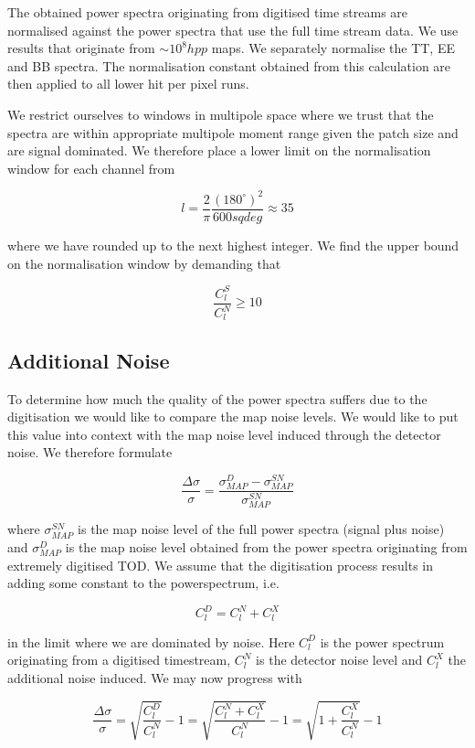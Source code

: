 \documentclass[apj]{emulateapj}
\begin{document}
The obtained power spectra originating from digitised time streams are normalised against the power spectra that use the full time stream data. We use results that originate from $\sim 10^8hpp$ maps. We separately normalise the TT, EE and BB spectra. The normalisation constant obtained from this calculation are then applied to all lower hit per pixel runs.

We restrict ourselves to windows in multipole space where we trust that the spectra are within appropriate multipole moment range given the patch size and are signal dominated. We therefore place a lower limit on the normalisation window for each channel from

\[ l = \frac{2}{\pi} \frac{(180^\circ )^2}{600 sqdeg} \approx 35 \]

where we have rounded up to the next highest integer. We find the upper bound on the normalisation window by demanding that

\[ \frac{C_l^{S}}{C_l^{N}} \geq 10 \]

\subsection{Additional Noise}
\label{subsec:additionalnoise}

To determine how much the quality of the power spectra suffers due to the digitisation we would like to compare the map noise levels. We would like to put this value into context with the map noise level induced through the detector noise. We therefore formulate

\[ \frac{\Delta \sigma}{\sigma} = \frac{\sigma_{MAP}^{D}-\sigma_{MAP}^{SN}}{\sigma_{MAP}^{SN}} \]

where $\sigma_{MAP}^{SN}$ is the map noise level of the full power spectra (signal plus noise) and $\sigma_{MAP}^{D}$ is the map noise level obtained from the power spectra originating from extremely digitised TOD. We assume that the digitisation process results in adding some constant  to the powerspectrum, i.e.

\[ C_l^D = C_l^N + C_l^X \]

in the limit where we are dominated by noise. Here $C_l^D$ is the power spectrum originating from a digitised timestream, $C_l^N$ is the detector noise level and $C_l^X$ the additional noise induced. We may now progress with

\[\frac{\Delta \sigma}{\sigma} = \sqrt{\frac{C_l^D}{C_l^{N}}} - 1  = \sqrt{\frac{C_l^N + C_l^X}{C_l^{N}}} - 1 = \sqrt{1 + \frac{C_l^X}{C_l^{N}}} - 1  \]
\end{document}
